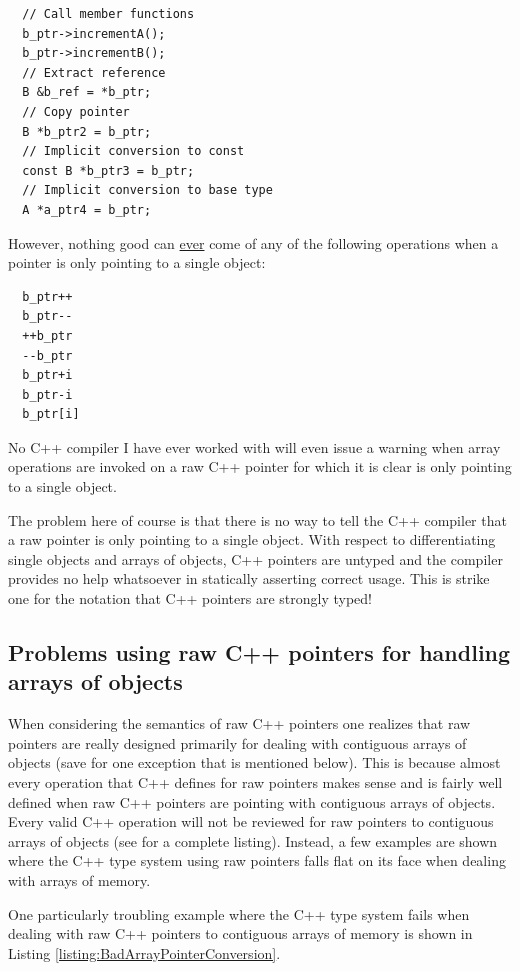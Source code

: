 \documentclass[pdf,ps2pdf,11pt]{SANDreport}
\begin{document}
{\small\begin{verbatim}
  // Call member functions
  b_ptr->incrementA();
  b_ptr->incrementB();
  // Extract reference
  B &b_ref = *b_ptr;
  // Copy pointer
  B *b_ptr2 = b_ptr;
  // Implicit conversion to const
  const B *b_ptr3 = b_ptr;
  // Implicit conversion to base type
  A *a_ptr4 = b_ptr;
\end{verbatim}}

However, nothing good can {}\underline{ever} come of any of the
following operations when a pointer is only pointing to a single
object:

{\small\begin{verbatim}
  b_ptr++
  b_ptr--
  ++b_ptr
  --b_ptr
  b_ptr+i
  b_ptr-i
  b_ptr[i]
\end{verbatim}}

No C++ compiler I have ever worked with will even issue a warning when
array operations are invoked on a raw C++ pointer for which it is
clear is only pointing to a single object.

The problem here of course is that there is no way to tell the C++
compiler that a raw pointer is only pointing to a single object.  With
respect to differentiating single objects and arrays of objects, C++
pointers are untyped and the compiler provides no help whatsoever in
statically asserting correct usage.  This is strike one for the
notation that C++ pointers are strongly typed!


%
{}\subsection{Problems using raw C++ pointers for handling arrays of
objects}
\label{sec:problem-with-raw-array-pointers}
%

When considering the semantics of raw C++ pointers one realizes that
raw pointers are really designed primarily for dealing with contiguous
arrays of objects (save for one exception that is mentioned below).
This is because almost every operation that C++ defines for raw
pointers makes sense and is fairly well defined when raw C++ pointers
are pointing with contiguous arrays of objects.  Every valid C++
operation will not be reviewed for raw pointers to contiguous arrays
of objects (see {}\cite{stroustrup97} for a complete listing).
Instead, a few examples are shown where the C++ type system using raw
pointers falls flat on its face when dealing with arrays of memory.

One particularly troubling example where the C++ type system fails
when dealing with raw C++ pointers to contiguous arrays of memory is
shown in Listing {}\ref{listing:BadArrayPointerConversion}.
\end{document}
